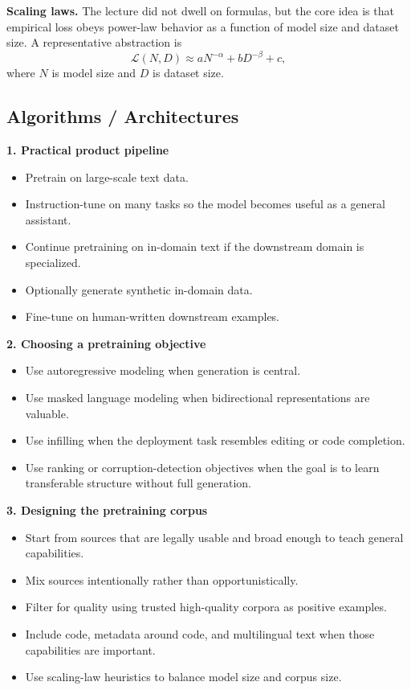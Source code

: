 \documentclass[11pt]{article}
\begin{document}
\textbf{Scaling laws.} The lecture did not dwell on formulas, but the core idea is that empirical loss obeys power-law behavior as a function of model size and dataset size. A representative abstraction is
\[
\mathcal{L}(N, D) \approx aN^{-\alpha} + bD^{-\beta} + c,
\]
where \(N\) is model size and \(D\) is dataset size.

\subsection{Algorithms / Architectures}
\textbf{1. Practical product pipeline}
\begin{itemize}
    \item Pretrain on large-scale text data.
    \item Instruction-tune on many tasks so the model becomes useful as a general assistant.
    \item Continue pretraining on in-domain text if the downstream domain is specialized.
    \item Optionally generate synthetic in-domain data.
    \item Fine-tune on human-written downstream examples.
\end{itemize}

\textbf{2. Choosing a pretraining objective}
\begin{itemize}
    \item Use autoregressive modeling when generation is central.
    \item Use masked language modeling when bidirectional representations are valuable.
    \item Use infilling when the deployment task resembles editing or code completion.
    \item Use ranking or corruption-detection objectives when the goal is to learn transferable structure without full generation.
\end{itemize}

\textbf{3. Designing the pretraining corpus}
\begin{itemize}
    \item Start from sources that are legally usable and broad enough to teach general capabilities.
    \item Mix sources intentionally rather than opportunistically.
    \item Filter for quality using trusted high-quality corpora as positive examples.
    \item Include code, metadata around code, and multilingual text when those capabilities are important.
    \item Use scaling-law heuristics to balance model size and corpus size.
\end{itemize}
\end{document}
